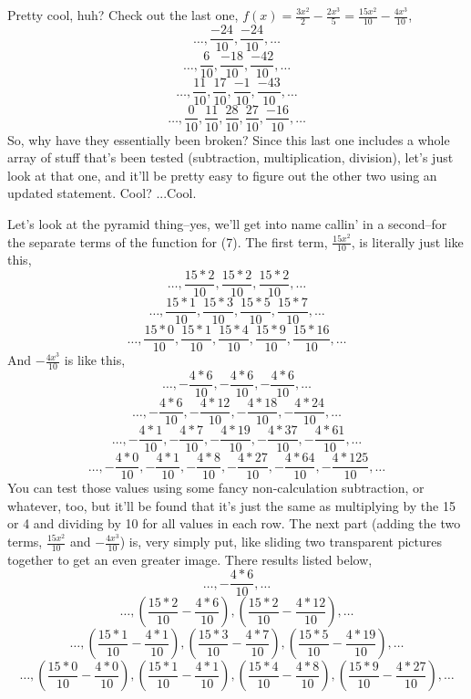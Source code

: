 \documentclass[12pt, letterpaper]{report}
\begin{document}
Pretty cool, huh? Check out the last one, $f(x)=\frac{3x^2}{2}-\frac{2x^3}{5}=\frac{15x^2}{10}-\frac{4x^3}{10}$,
$$\dots, \frac{-24}{10}, \frac{-24}{10}, \dots$$
$$\dots,  \frac{6}{10},  \frac{-18}{10},  \frac{-42}{10}, \dots$$
$$\dots,  \frac{11}{10},  \frac{17}{10},  \frac{-1}{10},  \frac{-43}{10}, \dots$$
\begin{equation}\dots,  \frac{0}{10},  \frac{11}{10},  \frac{28}{10},  \frac{27}{10},  \frac{-16}{10}, \dots\end{equation}
So, why have they essentially been broken? Since this last one includes a whole array of stuff that's been tested (subtraction, multiplication, division), let's just look at that one, and it'll be pretty easy to figure out the other two using an updated statement. Cool? ...Cool.

Let's look at the pyramid thing--yes, we'll get into name callin' in a second--for the separate terms of the function for (7). The first term, $\frac{15x^2}{10}$, is literally just like this,
$$\dots, \frac{15*2}{10}, \frac{15*2}{10}, \frac{15*2}{10}, \dots$$
$$\dots, \frac{15*1}{10}, \frac{15*3}{10}, \frac{15*5}{10}, \frac{15*7}{10}, \dots$$
\begin{equation}\dots, \frac{15*0}{10}, \frac{15*1}{10}, \frac{15*4}{10}, \frac{15*9}{10}, \frac{15*16}{10}, \dots\end{equation}
And $-\frac{4x^3}{10}$ is like this,
$$\dots,  -\frac{4*6}{10}, -\frac{4*6}{10}, -\frac{4*6}{10}, \dots$$
$$\dots, -\frac{4*6}{10}, -\frac{4*12}{10}, -\frac{4*18}{10}, -\frac{4*24}{10}, \dots$$
$$\dots, -\frac{4*1}{10}, -\frac{4*7}{10}, -\frac{4*19}{10}, -\frac{4*37}{10}, -\frac{4*61}{10}, \dots$$
\begin{equation}\dots, -\frac{4*0}{10}, -\frac{4*1}{10}, -\frac{4*8}{10}, -\frac{4*27}{10}, -\frac{4*64}{10}, -\frac{4*125}{10}, \dots\end{equation}
You can test those values using some fancy non-calculation subtraction, or whatever, too, but it'll be found that it's just the same as multiplying by the 15 or 4 and dividing by 10 for all values in each row. The next part  (adding the two terms, $\frac{15x^2}{10}$ and $-\frac{4x^3}{10}$) is, very simply put,  like sliding two transparent pictures together to get an even greater image. There results listed below,
$$\dots,  -\frac{4*6}{10}, \dots$$
$$\dots, (\frac{15*2}{10}-\frac{4*6}{10}), (\frac{15*2}{10}-\frac{4*12}{10}), \dots$$
$$\dots, (\frac{15*1}{10}-\frac{4*1}{10}), (\frac{15*3}{10}-\frac{4*7}{10}), (\frac{15*5}{10}-\frac{4*19}{10}), \dots$$
\begin{equation}\dots,  (\frac{15*0}{10}-\frac{4*0}{10}), (\frac{15*1}{10}-\frac{4*1}{10}), (\frac{15*4}{10}-\frac{4*8}{10}), (\frac{15*9}{10}-\frac{4*27}{10}), \dots\end{equation}
\end{document}
